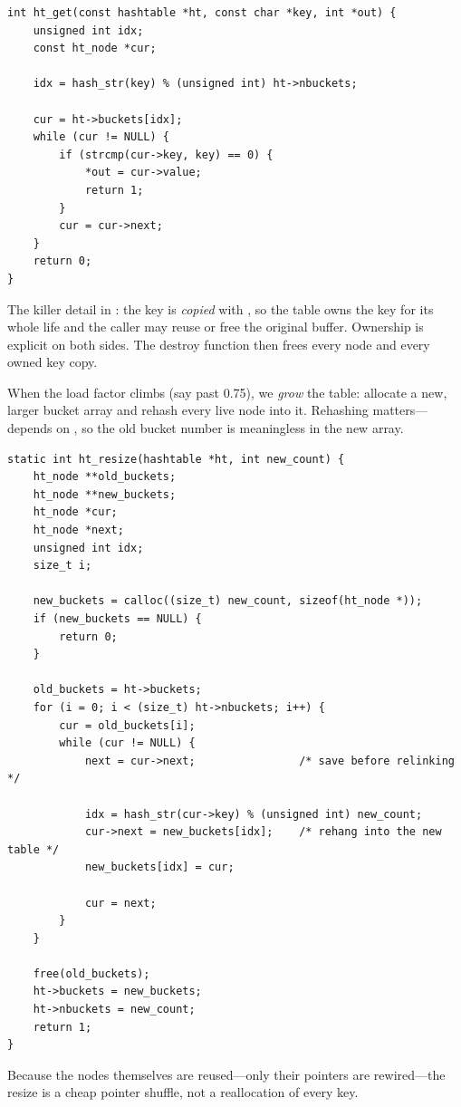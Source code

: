 \begin{lstlisting}[caption={Lookup. Returns 1 and sets *out when found.}]
int ht_get(const hashtable *ht, const char *key, int *out) {
    unsigned int idx;
    const ht_node *cur;

    idx = hash_str(key) % (unsigned int) ht->nbuckets;

    cur = ht->buckets[idx];
    while (cur != NULL) {
        if (strcmp(cur->key, key) == 0) {
            *out = cur->value;
            return 1;
        }
        cur = cur->next;
    }
    return 0;
}
\end{lstlisting}

The killer detail in : the key is \emph{copied} with
, so the table owns the key for its whole life and the
caller may reuse or free the original buffer. Ownership is explicit on
both sides. The destroy function then frees every node and every owned
key copy.

When the load factor climbs (say past 0.75), we \emph{grow} the table:
allocate a new, larger bucket array and rehash every live node into it.
Rehashing matters--- depends on , so the old
bucket number is meaningless in the new array.

\begin{lstlisting}[caption={Grow the table and rehash every node.}]
static int ht_resize(hashtable *ht, int new_count) {
    ht_node **old_buckets;
    ht_node **new_buckets;
    ht_node *cur;
    ht_node *next;
    unsigned int idx;
    size_t i;

    new_buckets = calloc((size_t) new_count, sizeof(ht_node *));
    if (new_buckets == NULL) {
        return 0;
    }

    old_buckets = ht->buckets;
    for (i = 0; i < (size_t) ht->nbuckets; i++) {
        cur = old_buckets[i];
        while (cur != NULL) {
            next = cur->next;                /* save before relinking */

            idx = hash_str(cur->key) % (unsigned int) new_count;
            cur->next = new_buckets[idx];    /* rehang into the new table */
            new_buckets[idx] = cur;

            cur = next;
        }
    }

    free(old_buckets);
    ht->buckets = new_buckets;
    ht->nbuckets = new_count;
    return 1;
}
\end{lstlisting}

Because the nodes themselves are reused---only their 
pointers are rewired---the resize is a cheap pointer shuffle, not a
reallocation of every key.

